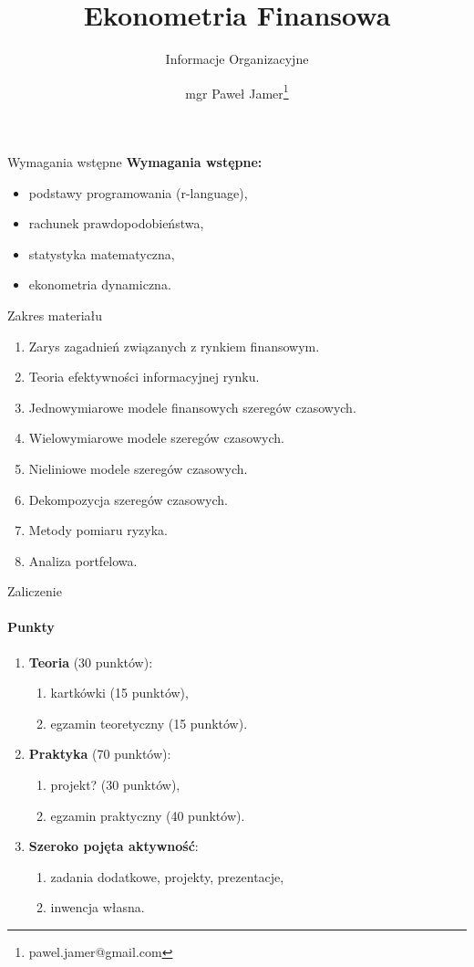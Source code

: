 \documentclass[a4paper, 11pt]{beamer}
\title{Ekonometria Finansowa}
\subtitle{Informacje Organizacyjne}
\author{mgr Paweł Jamer\thanks{pawel.jamer@gmail.com}}
\begin{document}
	\begin{frame}
		\titlepage
	\end{frame}

	\begin{frame}{Wymagania wstępne}
		\textbf{Wymagania wstępne:}
		\begin{itemize}
			\item podstawy programowania (r-language),
			\item rachunek prawdopodobieństwa,
			\item statystyka matematyczna,
			\item ekonometria dynamiczna.
		\end{itemize}
	\end{frame}
	
	\begin{frame}{Zakres materiału}
		\begin{enumerate}
			\item Zarys zagadnień związanych z rynkiem finansowym.
			\item Teoria efektywności informacyjnej rynku.
			\item Jednowymiarowe modele finansowych szeregów czasowych.
			\item Wielowymiarowe modele szeregów czasowych.
			\item Nieliniowe modele szeregów czasowych.
			\item Dekompozycja szeregów czasowych.
			\item Metody pomiaru ryzyka.
			\item Analiza portfelowa.
		\end{enumerate}
	\end{frame}

	\begin{frame}{Zaliczenie}
		\framesubtitle{Punkty}
		\begin{enumerate}
			\item \textbf{Teoria} (30 punktów):
			\begin{enumerate}
				\item kartkówki (15 punktów),
				\item egzamin teoretyczny (15 punktów).
			\end{enumerate}
			\item \textbf{Praktyka} (70 punktów):
			\begin{enumerate}
				\item projekt? (30 punktów),
				\item egzamin praktyczny (40 punktów).
			\end{enumerate}
			\item \textbf{Szeroko pojęta aktywność}:
			\begin{enumerate}
				\item zadania dodatkowe, projekty, prezentacje,
				\item inwencja własna.
			\end{enumerate}
		\end{enumerate}
	\end{frame}
	
\end{document}
